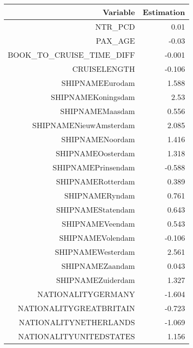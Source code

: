 \documentclass{article}
\begin{document}
\begin{table}[H]
	\centering
\begin{tabular}{rr}
	Variable & Estimation \\
	\hline 
	\hline 
	NTR\_PCD	                 &         0.01                  \\
	PAX\_AGE	                 &            -0.03              \\    
	BOOK\_TO\_CRUISE\_TIME\_DIFF &                         -0.001 \\                  
	CRUISELENGTH	         &         -0.106                \\  
	SHIPNAMEEurodam	         &         1.588                 \\ 
	SHIPNAMEKoningsdam	 &                 2.53          \\        
	SHIPNAMEMaasdam	         &         0.556                 \\ 
	SHIPNAMENieuwAmsterdam	 &                 2.085         \\         
	SHIPNAMENoordam	         &         1.416                 \\ 
	SHIPNAMEOosterdam	 &                 1.318         \\         
	SHIPNAMEPrinsendam	 &                 -0.588        \\          
	SHIPNAMERotterdam	 &                 0.389         \\         
	SHIPNAMERyndam	         &         0.761                 \\ 
	SHIPNAMEStatendam	 &                 0.643         \\         
	SHIPNAMEVeendam	         &         0.543                 \\ 
	SHIPNAMEVolendam	 &                 -0.106        \\          
	SHIPNAMEWesterdam	 &                 2.561         \\         
	SHIPNAMEZaandam	         &         0.043                 \\ 
	SHIPNAMEZuiderdam	 &                 1.327         \\         
	NATIONALITYGERMANY 	 &                 -1.604        \\          
	NATIONALITYGREATBRITAIN	 &                 -0.723        \\          
	NATIONALITYNETHERLANDS	 &                 -1.069        \\          
	NATIONALITYUNITEDSTATES	 &                 1.156         \\         

\end{tabular}
\end{table}
\end{document}
